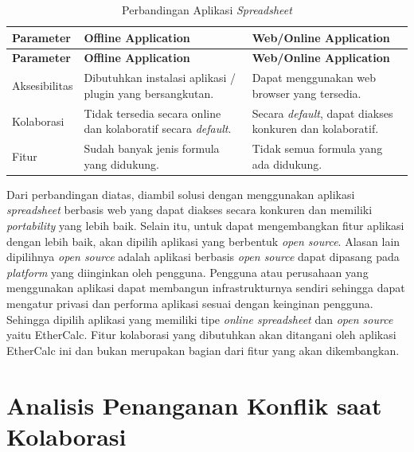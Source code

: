 \begin{small}
\begin{longtable}{ | p{3cm} | p{4cm} | p{4cm} | }
    \caption{Perbandingan Aplikasi \textit{Spreadsheet}}
    \label{AnalisisAplikasiDasar}\\ \hline
    \centering\bfseries{Parameter} & \centering\bfseries{Offline Application} & \centering\bfseries{Web/Online Application} \tabularnewline \hline
    \endfirsthead
    \hline
    \centering\bfseries{Parameter} & \centering\bfseries{Offline Application} & \centering\bfseries{Web/Online Application} \tabularnewline \hline
    \endhead
    Aksesibilitas & Dibutuhkan instalasi aplikasi / plugin yang bersangkutan. & Dapat menggunakan web browser yang tersedia. \\ \hline
    Kolaborasi & Tidak tersedia secara online dan kolaboratif secara \textit{default}. & Secara \textit{default}, dapat diakses konkuren dan kolaboratif. \\ \hline
    Fitur & Sudah banyak jenis formula yang didukung. & Tidak semua formula yang ada didukung. \\ \hline
\end{longtable}
\end{small}

Dari perbandingan diatas, diambil solusi dengan menggunakan aplikasi \textit{spreadsheet} berbasis web yang dapat diakses secara konkuren dan memiliki \textit{portability} yang lebih baik. Selain itu, untuk dapat mengembangkan fitur aplikasi dengan lebih baik, akan dipilih aplikasi yang berbentuk \textit{open source}. Alasan lain dipilihnya \textit{open source} adalah aplikasi berbasis \textit{open source} dapat dipasang pada \textit{platform} yang diinginkan oleh pengguna. Pengguna atau perusahaan yang menggunakan aplikasi dapat membangun infrastrukturnya sendiri sehingga dapat mengatur privasi dan performa aplikasi sesuai dengan keinginan pengguna. Sehingga dipilih aplikasi yang memiliki tipe \textit{online spreadsheet} dan \textit{open source} yaitu EtherCalc. Fitur kolaborasi yang dibutuhkan akan ditangani oleh aplikasi EtherCalc ini dan bukan merupakan bagian dari fitur yang akan dikembangkan.

\section{Analisis Penanganan Konflik saat Kolaborasi}


